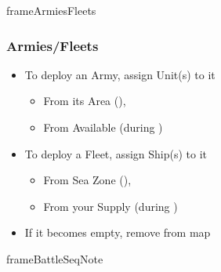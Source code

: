 \documentclass[10pt]{article}
\newlength{\fhArmiesFleets} \setlength\fhArmiesFleets{8\baselineskip}
\begin{document}
\begin{dynamiccontents*}{frameArmiesFleets}\begin{eubox}{\fhArmiesFleets}
	\subsubsection*{Armies/Fleets }
	\begin{itemize}
		\item To deploy an Army, assign Unit(s) to it 
		\begin{itemize}
			\item From its Area (), 
			\item From Available \manpower (during )
		\end{itemize}
		\item To deploy a Fleet, assign Ship(s) to it
		\begin{itemize}
			\item From Sea Zone (), 
			\item From your Supply (during )
		\end{itemize}
		\item If it becomes empty, remove from map
	\end{itemize}
\end{eubox}\end{dynamiccontents*}

\begin{dynamiccontents*}{frameBattleSeqNote}
\end{dynamiccontents*}
\end{document}
